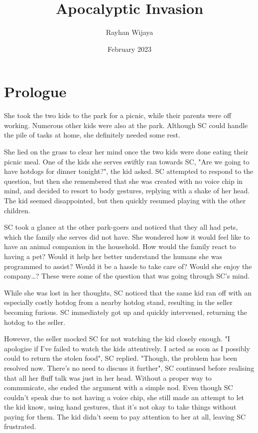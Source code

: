 \documentclass{article}
\title{Apocalyptic Invasion}
\author{Rayhan Wijaya}
\date{February 2023}
\begin{document}
\maketitle

\section*{Prologue}

She took the two kids to the park for a picnic, while
their parents were off working. Numerous other kids were
also at the park. Although SC could handle the pile of
tasks at home, she definitely needed some rest.

She lied on the grass to clear her mind once the two kids
were done eating their picnic meal. One of the kids she
serves swiftly ran towards SC, "Are we going to have
hotdogs for dinner tonight?", the kid asked. SC attempted
to respond to the question, but then she remembered that
she was created with no voice chip in mind, and decided
to resort to body gestures, replying with a shake of her
head. The kid seemed disappointed, but then quickly
resumed playing with the other children.

SC took a glance at the other park-goers and noticed that
they all had pets, which the family she serves did not
have. She wondered how it would feel like to have an
animal companion in the household. How would the family
react to having a pet? Would it help her better
understand the humans she was programmed to assist? Would
it be a hassle to take care of? Would she enjoy the
company…? These were some of the question that was going
through SC’s mind.

While she was lost in her thoughts, SC noticed that the
same kid ran off with an especially costly hotdog from a
nearby hotdog stand, resulting in the seller becoming
furious. SC immediately got up and quickly intervened,
returning the hotdog to the seller.

However, the seller mocked SC for not watching the kid
closely enough. "I apologise if I’ve failed to watch the
kids attentively. I acted as soon as I possibly could to
return the stolen food", SC replied. "Though, the problem
has been resolved now. There’s no need to discuss it
further", SC continued before realising that all her
fluff talk was just in her head. Without a proper way to
communicate, she ended the argument with a simple nod.
Even though SC couldn’t speak due to not having a voice
chip, she still made an attempt to let the kid know,
using hand gestures, that it’s not okay to take things
without paying for them. The kid didn’t seem to pay
attention to her at all, leaving SC frustrated.
\end{document}
